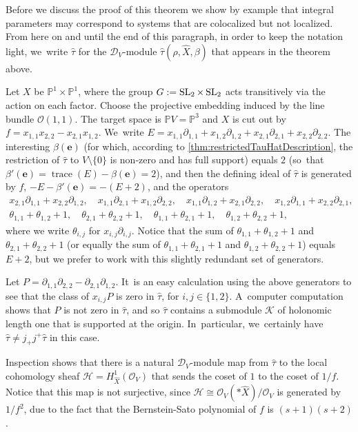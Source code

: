 \documentclass[11pt]{article}
\let\mathds\mathbb
\newcommand{\bme}{{\boldsymbol{e}}}
\newcommand{\dP}{{\mathds P}}\let\P\dP
\newcommand{\cD}{\mathscr{D}}
\newcommand{\cH}{\mathcal{H}}
\newcommand{\cK}{\mathcal{K}}
\newcommand{\cO}{\mathcal{O}}\let\O\cO
\DeclareMathOperator{\SL}{\textup{SL}}
\DeclareMathOperator{\trace}{trace}
\begin{document}
Before we discuss the proof of this theorem we show by example that integral parameters may correspond to systems that are colocalized but not localized. From here on and until the end of this paragraph, in order to keep the notation light, we~write $\hat\tau$ for the $\cD_V$\nobreakdash-mod\-ule
$\hat{\tau}(\rho, \hat{X}, \beta)$ that appears in the theorem above.

\begin{exa}\label{ex:Coloc}
Let $X$ be $\dP^1\times \dP^1$, where the group $G:=\SL_2\times\SL_2$ acts transitively via the action on each factor. Choose the projective embedding induced by the line bundle $\cO(1,1)$. The target space is $\dP V=\dP^3$ and $X$ is cut out by $f=x_{1,1}x_{2,2}-x_{2,1}x_{1,2}$. We~write
$E=x_{1,1}\partial_{1,1}+x_{1,2}\partial_{1,2}+
x_{2,1}\partial_{2,1}+x_{2,2}\partial_{2,2}$.
The interesting $\beta(\bme)$ (for which, according to \cref{thm:restrictedTauHatDescription}, the restriction of $\hat\tau$ to $V\setminus\{0\}$ is non-zero and has full support) equals $2$
(so~that $\beta'(\bme)=\trace(E)-\beta(\bme)=2$), and then the defining ideal of $\hat \tau$ is generated by $f$, $-E-\beta'(\bme)=-(E+2)$, and the operators
\begin{gather*}
x_{2,1}\partial_{1,1}+x_{2,2}\partial_{1,2},\quad x_{1,1}\partial_{2,1}+x_{1,2}\partial_{2,2},\quad x_{1,1}\partial_{1,2}+x_{2,1}\partial_{2,2},\quad x_{1,2}\partial_{1,1}+x_{2,2}\partial_{2,1},\\
\theta_{1,1}+\theta_{1,2}+1,\quad
\theta_{2,1}+\theta_{2,2}+1,\quad
\theta_{1,1}+\theta_{2,1}+1,\quad
\theta_{1,2}+\theta_{2,2}+1,
\end{gather*}
where we write $\theta_{i,j}$ for $x_{i,j}\partial_{i,j}$. Notice that the sum of $\theta_{1,1}+\theta_{1,2}+1$ and $\theta_{2,1}+\theta_{2,2}+1$ (or equally the sum of $\theta_{1,1}+\theta_{2,1}+1$ and $\theta_{1,2}+\theta_{2,2}+1$) equals $E+2$, but we prefer to work with this slightly redundant set of generators.

Let $P=\partial_{1,1}\partial_{2,2}-\partial_{2,1}\partial_{1,2}$. It~is an easy calculation using the above generators to see that the class of $x_{i,j}P$ is zero in $\hat\tau$, for $i,j\in\{1,2\}$. A~computer computation shows that $P$ is not zero in $\hat\tau$, and so $\hat\tau$ contains a submodule $\cK$ of holonomic length one that is supported at the origin. In~particular, we~certainly have $\hat{\tau}\neq j_+j^+\hat{\tau}$ in this case.

Inspection shows that there is a natural $\cD_V$\nobreakdash-mod\-ule map from $\hat\tau$ to the local cohomology sheaf $\cH=H^1_{\hat X}(\cO_V)$ that sends the coset of $1$ to the coset of $1/f$. Notice that this map is not surjective, since $\cH \cong \cO_V(*\hat{X})/\cO_V$ is generated by $1/f^2$, due to the fact that the Bernstein-Sato polynomial of $f$ is $(s+1)(s+2)$.


\end{exa}
\end{document}
